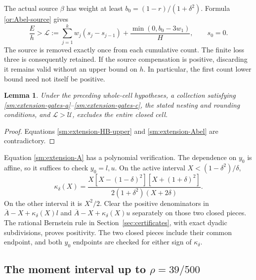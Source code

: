 \documentclass[11pt,reqno]{amsart}
\numberwithin{equation}{section}
\newtheorem{lemma}[theorem]{Lemma}
\theoremstyle{definition}
\theoremstyle{remark}
\begin{document}
The actual source $\beta$ has weight at least
$b_0=(1-r)/(1+\delta^2)$. Formula \eqref{or:Abel-source} gives
\begin{equation}\label{sm:extension-Abel}
 \frac Eh>
 \mathcal L:=\sum_{j=1}^kw_j(s_j-s_{j-1})
                   +\frac{\min(0,b_0-3w_1)}{H},
 \qquad s_0=0.
\end{equation}
The source is removed exactly once from each cumulative count.
The finite loss three is consequently retained. If the source
compensation is positive, discarding it remains valid without
an upper bound on $h$. In particular, the first count lower
bound need not itself be positive.

\begin{lemma}\label{sm:extension-cell}
Under the preceding whole-cell hypotheses, a collection satisfying
\eqref{sm:extension-gates-a}--\eqref{sm:extension-gates-c},
the stated nesting and rounding conditions, and
$\mathcal L>\mathcal U$, excludes the entire closed cell.
\end{lemma}
\begin{proof}
Equations \eqref{sm:extension-HB-upper} and
\eqref{sm:extension-Abel} are contradictory.
\end{proof}

Equation \eqref{sm:extension-A} has a polynomial verification.
The dependence on $y_0$ is affine, so it suffices to check
$y_0=l,u$. On the active interval
$X<(1-\delta^2)/\delta$,
\begin{equation}\label{sm:extension-kappa-active}
 \kappa_\delta(X)=
 \frac{X[X-(1-\delta)^2][X+(1+\delta)^2]}
             {2(1+\delta^2)(X+2\delta)}.
\end{equation}
On the other interval it is $X^2/2$.
Clear the positive denominators in
$\overline A-X+\kappa_\delta(X)l$ and
$\overline A-X+\kappa_\delta(X)u$ separately on those two
closed pieces. The rational Bernstein rule in
Section~\ref{sec:certificates}, with exact dyadic subdivisions,
proves positivity. The two closed pieces include their common
endpoint, and both $y_0$ endpoints are checked for either sign
of $\kappa_\delta$.

\subsection{The moment interval up to \texorpdfstring{$\rho=39/500$}{rho=39/500}}
\end{document}
